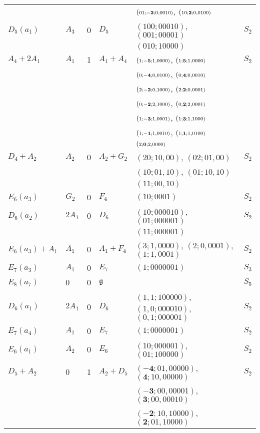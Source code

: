 \documentclass[a4paper,10pt]{amsart}
\newcommand{\mf}{\mathfrak}
\newcommand{\g}{\mf{g}}
\newcommand{\wtt}[3]{{\small (\scriptstyle{#1};\scriptstyle{\mathbf{#2}};\scriptstyle{#3})}}
\newcommand{\wts}[2]{{({\scriptstyle{#1}};{\scriptstyle{#2}})}}
\numberwithin{equation}{section}
\theoremstyle{remark}
\theoremstyle{remark}
\begin{document}
\begin{longtable}{|l|l|l|l|l|l|}
& & & & $\wtt{01}{-2}{0,0010}$, $\wtt{10}{2}{0,0100}$ &\\
$D_5(a_1)$ & $A_3$ & 0 & $D_5$ & $\wts{100}{00010}$, $\wts{001}{00001}$ &
$S_2$\\
&&&& $\wts{010}{10000}$ & \\
$A_4+2A_1$ & $A_1$ & 1  & $A_1+A_4$ & $\wtt{1}{-5}{1,0000}$, $\wtt{1}{5}{1,0000}$
& $S_2$\\
&&&&  $\wtt{0}{-4}{0,0100}$, $\wtt{0}{4}{0,0010}$ & \\
&&&&  $\wtt{2}{-2}{0,1000}$, $\wtt{2}{2}{0,0001}$ & \\
&&&&  $\wtt{0}{-2}{2,1000}$, $\wtt{0}{2}{2,0001}$ & \\
&&&&  $\wtt{1}{-3}{1,0001}$, $\wtt{1}{3}{1,1000}$ & \\
&&&&  $\wtt{1}{-1}{1,0010}$, $\wtt{1}{1}{1,0100}$ & \\
&&&&  $\wtt{2}{0}{2,0000}$ & \\
$D_4+A_2$ & $A_2$ & 0 & $A_2+G_2$ & $\wts{20}{10,00}$, $\wts{02}{01,00}$ & 
$S_2$\\
&&&& $\wts{10}{01,10}$, $\wts{01}{10,10}$ & \\
&&&& $\wts{11}{00,10}$ & \\
$E_6(a_3)$ & $G_2$ & 0 & $F_4$ & $\wts{10}{0001}$ & $S_2$\\
$D_6(a_2)$ & $2A_1$ & 0 & $D_6$ & $\wts{10}{000010}$, $\wts{01}{000001}$ &
$S_2$ \\
&&&& $\wts{11}{000001}$ & \\
$E_6(a_3)+A_1$ & $A_1$ & 0 & $A_1+F_4$ & $\wts{3}{1,0000}$, $\wts{2}{0,0001}$,
$\wts{1}{1,0001}$ & $S_2$\\
$E_7(a_3)$ & $A_1$ & 0 & $E_7$ & $\wts{1}{0000001}$ & $S_3$\\
$E_8(a_7)$ & 0 & 0 & $\g$ & & $S_5$ \\
$D_6(a_1)$ & $2A_1$ & 0 & $D_6$ & $\wts{1,1}{100000}$, $\wts{1,0}{000010}$,
$\wts{0,1}{000001}$ & $S_2$\\
$E_7(a_4)$ & $A_1$ & 0 & $E_7$ & $\wts{1}{0000001}$ & $S_2$ \\
$E_6(a_1)$ & $A_2$ & 0 & $E_6$ & $\wts{10}{000001}$, $\wts{01}{100000}$ &
$S_2$\\
$D_5+A_2$ & 0 & 1 & $A_2+D_5$ & $\wts{\mathbf{-4}}{01,00000}$,
$\wts{\mathbf{4}}{10,00000}$ & $S_2$ \\
&&&&  $\wts{\mathbf{-3}}{00,00001}$, $\wts{\mathbf{3}}{00,00010}$ &\\
&&&&  $\wts{\mathbf{-2}}{10,10000}$, $\wts{\mathbf{2}}{01,10000}$ &\\

\end{longtable}
\end{document}
